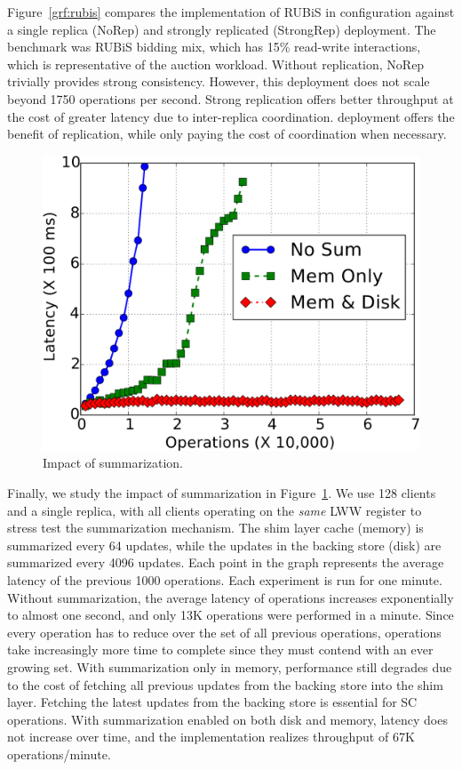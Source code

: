 Figure~\ref{grf:rubis} compares the \name implementation of RUBiS in 
configuration against a single replica (NoRep) and strongly replicated
(StrongRep)  deployment. The benchmark was RUBiS bidding mix, which has
15\% read-write interactions, which is representative of the auction workload.
Without replication, NoRep trivially provides strong consistency. However, this
deployment does not scale beyond 1750 operations per second. Strong replication
offers better throughput at the cost of greater latency due to inter-replica
coordination. \name deployment offers the benefit of replication, while only
paying the cost of coordination when necessary.

\begin{figure}
\centering
\includegraphics[width=0.75\columnwidth]{graphs/summarization.pdf}
\caption{Impact of summarization.}
\label{grf:summarization}
\end{figure}

Finally, we study the impact of summarization in
Figure~\ref{grf:summarization}. We use 128 clients and a single \name replica,
with all clients operating on the \emph{same} LWW register to stress test the
summarization mechanism. The shim layer cache (memory) is summarized every 64
updates, while the updates in the backing store (disk) are summarized every
4096 updates. Each point in the graph represents the average latency of the
previous 1000 operations. Each experiment is run for one minute.  Without
summarization, the average latency of operations increases exponentially to
almost one second, and only 13K operations were performed in a minute. Since
every operation has to reduce over the set of all previous operations,
operations take increasingly more time to complete since they must contend with
an ever growing set.  With summarization only in memory, performance still
degrades due to the cost of fetching all previous updates from the backing
store into the shim layer. Fetching the latest updates from the backing store
is essential for SC operations. With summarization enabled on both disk and
memory, latency does not increase over time, and the implementation realizes
throughput of 67K operations/minute.
